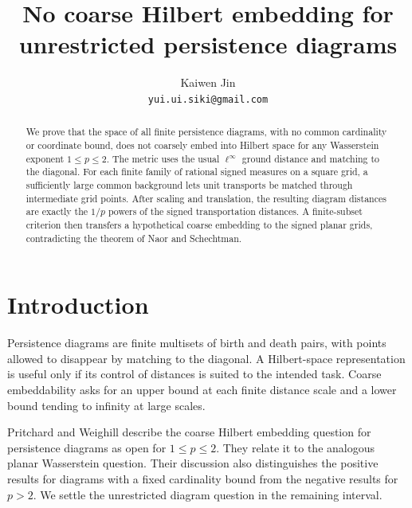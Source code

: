 \documentclass[11pt]{article}
\title{No coarse Hilbert embedding for unrestricted persistence diagrams}
\author{Kaiwen Jin\\\small\texttt{yui.ui.siki@gmail.com}}
\date{}
\theoremstyle{remark}
\begin{document}
\maketitle

\begin{abstract}
We prove that the space of all finite persistence diagrams, with no common cardinality or coordinate bound, does not coarsely embed into Hilbert space for any Wasserstein exponent \(1\le p\le2\). The metric uses the usual \(\ell^\infty\) ground distance and matching to the diagonal. For each finite family of rational signed measures on a square grid, a sufficiently large common background lets unit transports be matched through intermediate grid points. After scaling and translation, the resulting diagram distances are exactly the \(1/p\) powers of the signed transportation distances. A finite-subset criterion then transfers a hypothetical coarse embedding to the signed planar grids, contradicting the theorem of Naor and Schechtman.
\end{abstract}

\section{Introduction}

Persistence diagrams are finite multisets of birth and death pairs, with points allowed to disappear by matching to the diagonal. A Hilbert-space representation is useful only if its control of distances is suited to the intended task. Coarse embeddability asks for an upper bound at each finite distance scale and a lower bound tending to infinity at large scales.

Pritchard and Weighill \cite{pw} describe the coarse Hilbert embedding question for persistence diagrams as open for \(1\le p\le2\). They relate it to the analogous planar Wasserstein question. Their discussion also distinguishes the positive results for diagrams with a fixed cardinality bound from the negative results for \(p>2\). We settle the unrestricted diagram question in the remaining interval.
\end{document}

